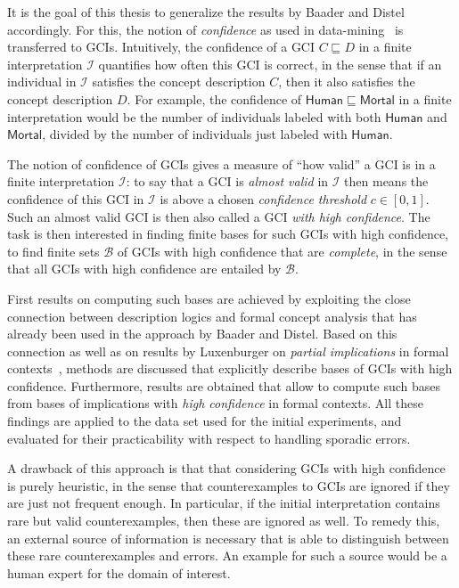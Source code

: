 \documentclass[english,fleqn]{scrartcl}
\begin{document}
It is the goal of this thesis to generalize the results by Baader and Distel accordingly.
For this, the notion of \emph{confidence} as used in
data-mining~\cite{arules:agrawal:association-rules} is transferred to GCIs.  Intuitively,
the confidence of a GCI $C \sqsubseteq D$ in a finite interpretation $\mathcal{I}$
quantifies how often this GCI is correct, in the sense that if an individual in
$\mathcal{I}$ satisfies the concept description $C$, then it also satisfies the concept
description $D$.  For example, the confidence of $\mathsf{Human} \sqsubseteq
\mathsf{Mortal}$ in a finite interpretation would be the number of individuals labeled
with both $\mathsf{Human}$ and $\mathsf{Mortal}$, divided by the number of individuals
just labeled with $\mathsf{Human}$.

The notion of confidence of GCIs gives a measure of \enquote{how valid} a GCI is in a
finite interpretation $\mathcal{I}$: to say that a GCI is \emph{almost valid} in
$\mathcal{I}$ then means the confidence of this GCI in $\mathcal{I}$ is above a chosen
\emph{confidence threshold} $c \in [0,1]$.  Such an almost valid GCI is then also called a
GCI \emph{with high confidence}.  The task is then interested in finding finite bases for
such GCIs with high confidence, \ie to find finite sets $\mathcal{B}$ of GCIs with high
confidence that are \emph{complete}, in the sense that all GCIs with high confidence are
entailed by $\mathcal{B}$.

First results on computing such bases are achieved by exploiting the close connection
between description logics and formal concept analysis that has already been used in the
approach by Baader and Distel.  Based on this connection as well as on results by
Luxenburger on \emph{partial implications} in formal contexts~\cite{diss:Luxenburger},
methods are discussed that explicitly describe bases of GCIs with high confidence.
Furthermore, results are obtained that allow to compute such bases from bases of
implications with \emph{high confidence} in formal contexts.  All these findings are
applied to the data set used for the initial experiments, and evaluated for their
practicability with respect to handling sporadic errors.

A drawback of this approach is that that considering GCIs with high confidence is purely
heuristic, in the sense that counterexamples to GCIs are ignored if they are just not
frequent enough.  In particular, if the initial interpretation contains rare but valid
counterexamples, then these are ignored as well.  To remedy this, an external source of
information is necessary that is able to distinguish between these rare counterexamples
and errors.  An example for such a source would be a human expert for the domain of
interest.
\end{document}
